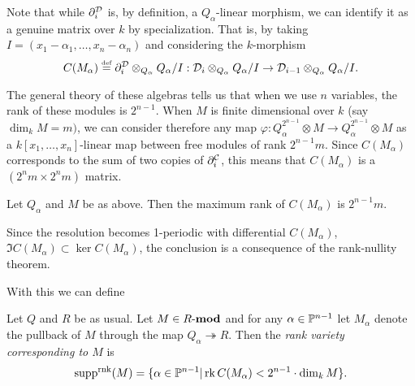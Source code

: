 \documentclass[12pt]{article}
\DeclareMathOperator{\rk}{rk}
\begin{document}
Note that while $\partial^{\mathcal{D}}_i$ is, by definition, a $Q_\alpha$-linear morphism, we can identify it as a genuine matrix over $k$ by specialization. That is, by taking $I=(x_1-\alpha_1,\dots,x_n-\alpha_n)$ and considering the $k$-morphism
\[C(M_\alpha)\stackrel{\text{\tiny def}}{=} \partial^{\mathcal{D}}_i\otimes_{Q_\alpha}Q_\alpha/I:\mathcal{D}_i\otimes_{Q_\alpha}Q_\alpha/I\to \mathcal{D}_{i-1}\otimes_{Q_\alpha}Q_\alpha/I.\]

The general theory of these algebras tells us that when we use $n$ variables, the rank of these modules is $2^{n-1}$. When $M$ is finite dimensional over $k$ (say $\dim_k M=m)$, we can consider therefore any map $\varphi:Q_\alpha^{2^{n-1}}\otimes M\to Q_\alpha^{2^{n-1}}\otimes M$ as a $k[x_1,\dots,x_n]$-linear map between free modules of rank $ 2^{n-1}m.$ Since $C(M_\alpha)$  corresponds to the sum of two copies of $\partial^{\mathcal{C}}_i$, this means that $C(M_\alpha)$ is a $(2^nm\times 2^nm)$ matrix.

\begin{prop}
    Let $Q_\alpha$ and $M$ be as above. Then the maximum rank of $C(M_\alpha)$ is $2^{n-1}m$.
\end{prop}
\begin{prf}
    Since the resolution becomes 1-periodic with differential $C(M_\alpha)$, $\Im C(M_\alpha)\subset \ker C(M_\alpha)$, the conclusion is a consequence of the rank-nullity theorem.
\end{prf}

With this we can define
\begin{defn}
    Let $Q$ and $R$ be as usual. Let $M\in R\text{-}\mathbf{mod}$ and for any $\alpha\in\mathbb{P}^{n-1}$ let $M_\alpha$ denote the pullback of $M$ through the map $Q_\alpha\twoheadrightarrow R$. Then the \emph{rank variety corresponding to $M$} is
    \[\supp^\mathrm{rnk}(M)=\{\alpha\in\bbP^{n-1}|\rk C(M_\alpha) < 2^{n-1}\cdot\dim_k M\}.\]
\end{defn}
\end{document}
